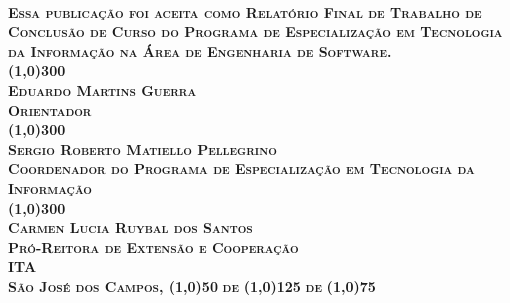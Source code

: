 \begin{titlepage}
\begin{center}
	\large \bfseries \scshape \tcctitle \\[2cm]	
	\normalfont
	\normalsize Essa publicação foi aceita como Relatório Final de Trabalho de Conclusão de Curso do Programa de Especialização em Tecnologia da Informação na Área de Engenharia de Software.\\[2cm]

	\line(1,0){300}\\
	\normalsize Eduardo Martins Guerra\\
	\normalsize Orientador\\[2cm]

	\line(1,0){300}\\
	\normalsize Sergio Roberto Matiello Pellegrino\\
	\normalsize Coordenador do Programa de Especialização em Tecnologia da Informação\\[2cm]

	\line(1,0){300}\\
	\normalsize Carmen Lucia Ruybal dos Santos\\
	\normalsize Pró-Reitora de Extensão e Cooperação\\[2cm]
	
	\LARGE \bfseries ITA\\[2cm]
	\normalsize São José dos Campos, \line(1,0){50}\,\,de\,\,\line(1,0){125}\,\,de\,\,\line(1,0){75}

\end{center}
\end{titlepage}